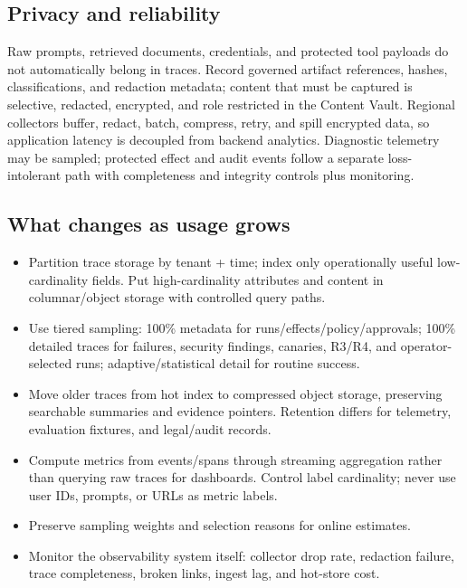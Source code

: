 \subsection{Privacy and reliability}

Raw prompts, retrieved documents, credentials, and protected tool payloads do not automatically belong in traces. Record governed artifact references, hashes, classifications, and redaction metadata; content that must be captured is selective, redacted, encrypted, and role restricted in the Content Vault. Regional collectors buffer, redact, batch, compress, retry, and spill encrypted data, so application latency is decoupled from backend analytics. Diagnostic telemetry may be sampled; protected effect and audit events follow a separate loss-intolerant path with completeness and integrity controls plus monitoring.\par

\subsection{What changes as usage grows}

\begin{itemize}

\item Partition trace storage by tenant + time; index only operationally useful low-cardinality fields. Put high-cardinality attributes and content in columnar/object storage with controlled query paths.

\item Use tiered sampling: 100\% metadata for runs/effects/policy/approvals; 100\% detailed traces for failures, security findings, canaries, R3/R4, and operator-selected runs; adaptive/statistical detail for routine success.

\item Move older traces from hot index to compressed object storage, preserving searchable summaries and evidence pointers. Retention differs for telemetry, evaluation fixtures, and legal/audit records.

\item Compute metrics from events/spans through streaming aggregation rather than querying raw traces for dashboards. Control label cardinality; never use user IDs, prompts, or URLs as metric labels.

\item Preserve sampling weights and selection reasons for online estimates.

\item Monitor the observability system itself: collector drop rate, redaction failure, trace completeness, broken links, ingest lag, and hot-store cost.

\end{itemize}

